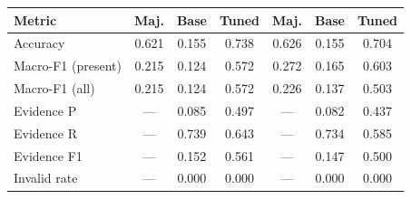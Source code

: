 \begin{tabular}{lcccccc}
\hline
Metric & Maj. & Base & Tuned & Maj. & Base & Tuned \\
\hline
Accuracy & 0.621 & 0.155 & 0.738 & 0.626 & 0.155 & 0.704 \\
Macro-F1 (present) & 0.215 & 0.124 & 0.572 & 0.272 & 0.165 & 0.603 \\
Macro-F1 (all) & 0.215 & 0.124 & 0.572 & 0.226 & 0.137 & 0.503 \\
Evidence P & --- & 0.085 & 0.497 & --- & 0.082 & 0.437 \\
Evidence R & --- & 0.739 & 0.643 & --- & 0.734 & 0.585 \\
Evidence F1 & --- & 0.152 & 0.561 & --- & 0.147 & 0.500 \\
Invalid rate & --- & 0.000 & 0.000 & --- & 0.000 & 0.000 \\
\hline
\end{tabular}
